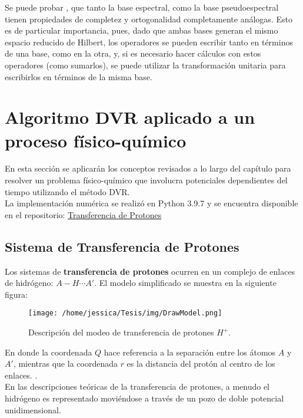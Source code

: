 Se puede probar \cite{Tannor:2006}, que tanto la base espectral, como la base pseudoespectral tienen propiedades de completez y ortogonalidad completamente análogas. Esto es de particular importancia, pues, dado que ambas bases generan el mismo espacio reducido de Hilbert, los operadores se pueden escribir tanto en términos de una base, como en la otra, y, si es necesario hacer cálculos con estos operadores (como sumarlos), se puede utilizar la transformación unitaria para escribirlos en términos de la misma base.


\section{Algoritmo DVR aplicado a un proceso físico-químico}

En esta sección se aplicarán los conceptos revisados a lo largo del capítulo para resolver un problema físico-químico que involucra potenciales dependientes del tiempo utilizando el método DVR.\\
La implementación numérica se realizó en Python 3.9.7 y se encuentra disponible en el repositorio: \href{https://github.com/Jessi-MM/PropagatorLearning/blob/main/src/ANN_as_Propagators_DidacticNotebook.ipynb}{\faGithub Transferencia de Protones}

\subsection{Sistema de Transferencia de Protones}\label{sec:ProtonTransfer}

Los sistemas de \textbf{transferencia de protones} ocurren en un complejo de enlaces de hidrógeno: $A-H\dotsb A'$. El modelo simplificado se muestra en la siguiente figura:

\begin{figure}[ht]
  \centering
\texttt{[image: /home/jessica/Tesis/img/DrawModel.png]}
\caption{Descripción del modeo de transferencia de protones $H^+$.}
\label{fig:drawmodel}
\end{figure}

En donde la coordenada $Q$ hace referencia a la separación entre los átomos $A$ y $A'$, mientras que la coordenada $r$ es la distancia del protón al centro de los enlaces. \cite{DynamicalTheoryPTS}. \\
En las descripciones teóricas de la transferencia de protones, a menudo el hidrógeno es representado moviéndose a través de un pozo de doble potencial unidimensional. \cite{Enzymes}
\\

